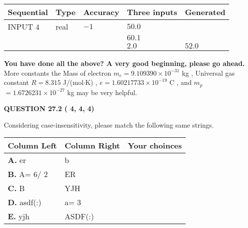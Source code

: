 \documentclass[12pt]{article}
\begin{document}
   
  
  
\noindent\begin{tabular}{|l|l|l|l|l|}
\hline
 Sequential & Type & Accuracy & Three inputs & Generated \\ 
\hline
 
 
  INPUT $           4$ & real & $          -1 $ & $
 50.0
  $ & \\
  & & &  $
 60.1
  $ & \\
  & & &  $
 2.0
 $ & $ 52.0 $ 
 \\  \hline  
 \end{tabular}
   
   
   
   
\vspace{0.3in}
{\textbf{\LARGE{You have done all the above? A very good beginning, please go ahead.}}}
More constants the
Mass of electron
$m_e$$ =
9.109390 \times 10^{-31} $
kg
,
Universal gas constant
$R$$ =
8.315 $
J/(mol$\cdot $K)
,
$e$$ =
1.60217733 \times 10^{-19} $
C
, and
$m_p$$ =
1.6726231 \times 10^{-27} $
kg
%
may be very helpful.
\vspace{0.3in}
   
   
  
\vspace{0.2in}
  
{\textbf{\Large{QUESTION
27.2 
 (          4,          4,          4)
}}}
  
  
Considering case-insensitivity, please match the following same strings.
  
  
\begin{tabular}{|l|l|l|}
 \hline
 Column Left & Column Right  & Your choinces \\ 
 \hline
{\textbf{\large{
A.}}}
er
  & 
b
 & 
 \\ 
 \hline
{\textbf{\large{
B.}}}
 A= %
6/ %
2

  & 
ER
 & 
 \\ 
 \hline
{\textbf{\large{
C.}}}
B
  & 
YJH
 & 
 \\ 
 \hline
{\textbf{\large{
D.}}}
asdf(:)
  & 
 a= %
3
 & 
 \\ 
 \hline
{\textbf{\large{
E.}}}
yjh
  & 
ASDF(:)
 & 
 \\ 
 \hline
 \end{tabular}
  
  
 
 
\noindent{}
  
\end{document}
